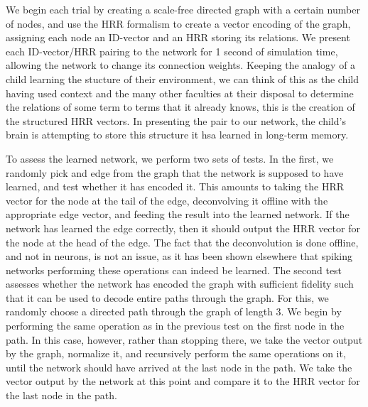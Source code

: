 \documentclass[10pt,letterpaper]{article}
\begin{document}
We begin each trial by creating a scale-free directed graph with a certain number of nodes, and use the HRR formalism to create a vector encoding of the graph, assigning each node an ID-vector and an HRR storing its relations. We present each ID-vector/HRR pairing to the network for 1 second of simulation time, allowing the network to change its connection weights. Keeping the analogy of a child learning the stucture of their environment, we can think of this as the child having used context and the many other faculties at their disposal to determine the relations of some term to terms that it already knows, this is the creation of the structured HRR vectors. In presenting the pair to our network, the child's brain is attempting to store this structure it hsa learned in long-term memory.

To assess the learned network, we perform two sets of tests. In the first, we randomly pick and edge from the graph that the network is supposed to have learned, and test whether it has encoded it. This amounts to taking the HRR vector for the node at the tail of the edge, deconvolving it offline with the appropriate edge vector, and feeding the result into the learned network. If the network has learned the edge correctly, then it should output the HRR vector for the node at the head of the edge. The fact that the deconvolution is done offline, and not in neurons, is not an issue, as it has been shown elsewhere that spiking networks performing these operations can indeed be learned. The second test assesses whether the network has encoded the graph with sufficient fidelity such that it can be used to decode entire paths through the graph. For this, we randomly choose a directed path through the graph of length 3. We begin by performing the same operation as in the previous test on the first node in the path. In this case, however, rather than stopping there, we take the vector output by the graph, normalize it, and recursively perform the same operations on it, until the network should have arrived at the last node in the path. We take the vector output by the network at this point and compare it to the HRR vector for the last node in the path. 

\end{document}
